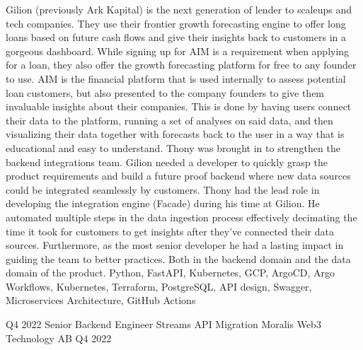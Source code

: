 \begin{experiences}
{        Gilion (previously Ark Kapital) is the next generation of lender to scaleups and tech companies.
        They use their frontier growth forecasting engine to offer long loans based on future cash flows and give their insights back to customers in a gorgeous dashboard.
        While signing up for AIM is a requirement when applying for a loan, they also offer the growth forecasting platform for free to any founder to use.
        \newline \newline
        AIM is the financial platform that is used internally to assess potential loan customers, but also presented to the company founders to give them invaluable insights about their companies.
        This is done by having users connect their data to the platform, running a set of analyses on said data, and then visualizing their data together with forecasts back to the user in a way that is educational and easy to understand.
        Thony was brought in to strengthen the backend integrations team.
        Gilion needed a developer to quickly grasp the product requirements and build a future proof backend where new data sources could be integrated seamlessly by customers.
        \newline \newline
        Thony had the lead role in developing the integration engine (Facade) during his time at Gilion.
        He automated multiple steps in the data ingestion process effectively decimating the time it took for customers to get insights after they've connected their data sources.
        Furthermore, as the most senior developer he had a lasting impact in guiding the team to better practices.
        Both in the backend domain and the data domain of the product.
        \newline
    }
    {Python, FastAPI, Kubernetes, GCP, ArgoCD, Argo Workflows, Kubernetes, Terraform, PostgreSQL, API design, Swagger, Microservices Architecture, GitHub Actions}
    \emptySeparator
    
    \experience
    {Q4 2022}   
    {Senior Backend Engineer}
    {Streams API Migration}
    {Moralis Web3 Technology AB}
    {Q4 2022} {
    
}
\end{experiences}
